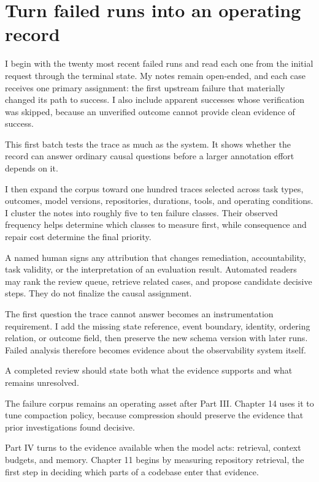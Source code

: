 \section{Turn failed runs into an operating record}\label{turn-failed-runs-into-an-operating-record}

I begin with the twenty most recent failed runs and read each one from the initial request through the terminal state. My notes remain open-ended, and each case receives one primary assignment: the first upstream failure that materially changed its path to success. I also include apparent successes whose verification was skipped, because an unverified outcome cannot provide clean evidence of success.

This first batch tests the trace as much as the system. It shows whether the record can answer ordinary causal questions before a larger annotation effort depends on it.

I then expand the corpus toward one hundred traces selected across task types, outcomes, model versions, repositories, durations, tools, and operating conditions. I cluster the notes into roughly five to ten failure classes. Their observed frequency helps determine which classes to measure first, while consequence and repair cost determine the final priority.

A named human signs any attribution that changes remediation, accountability, task validity, or the interpretation of an evaluation result. Automated readers may rank the review queue, retrieve related cases, and propose candidate decisive steps. They do not finalize the causal assignment.

The first question the trace cannot answer becomes an instrumentation requirement. I add the missing state reference, event boundary, identity, ordering relation, or outcome field, then preserve the new schema version with later runs. Failed analysis therefore becomes evidence about the observability system itself.

A completed review should state both what the evidence supports and what remains unresolved.

The failure corpus remains an operating asset after Part III. Chapter 14 uses it to tune compaction policy, because compression should preserve the evidence that prior investigations found decisive.

Part IV turns to the evidence available when the model acts: retrieval, context budgets, and memory. Chapter 11 begins by measuring repository retrieval, the first step in deciding which parts of a codebase enter that evidence.

